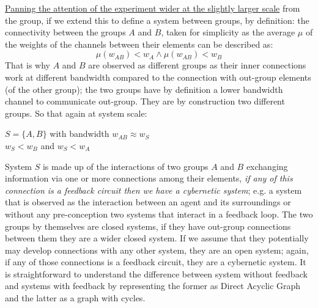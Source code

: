 \documentclass[14pt]{extarticle}
\begin{document}
\hspace*{15mm}\underline{Panning the attention of the experiment wider at the slightly larger scale} from the group, if we extend this to define a system between groups, by definition: the connectivity between the groups \(A\) and \(B\), taken for simplicity as the average $\mu$ of the weights of the channels between their elements can be described as:
\[\mu(w_{AB}) < w_A \wedge \mu(w_{AB}) < w_B\]
That is why \(A\) and \(B\) are observed as different groups as their inner connections work at different bandwidth compared to the connection with out-group elements (of the other group); the two groups have by definition a lower bandwidth channel to communicate out-group. They are by construction two different groups. So that again at system scale:
\begin{center}
\(S = \{ A, B \}\) with bandwidth \(w_{AB} \approx w_S\)\\
\(w_S < w_B\)  and  \(w_S < w_A\)
\end{center}

\hspace*{15mm}System \(S\) is made up of the interactions of two groups \(A\) and \(B\) exchanging information via one or more connections among their elements, \textit{if any of this connection is a feedback circuit then we have a cybernetic system}; e.g. a system that is observed as the interaction between an agent and its surroundings or without any pre-conception two systems that interact in a feedback loop.
\newline 
\hspace*{15mm}The two groups by themselves are closed systems, if they have out-group connections between them they are a wider closed system. If we assume that they potentially may develop connections with any other system, they are an open system; again, if any of those connections is a feedback circuit, they are a cybernetic system.
\newline 
\hspace*{15mm} It is straightforward to understand the difference between system without feedback and systems with feedback by representing the former as Direct Acyclic Graph and the latter as a graph with cycles.

\vspace{0.5cm}
\end{document}
